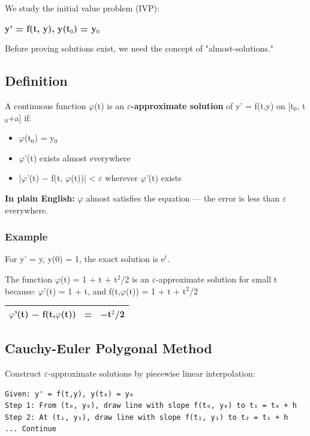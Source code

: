 \documentclass[12pt,a4paper,openany]{book}
\begin{document}
{{We study the initial value problem (IVP):

\textbf{y' = f(t, y), y(t$_0$) = y$_0$}

Before proving solutions exist, we need the concept of "almost-solutions."

\subsection{Definition}

A continuous function $\varphi$(t) is an \textbf{$\varepsilon$-approximate solution} of y' = f(t,y) on [t$_0$, t$_0$+a] if:

\begin{itemize}
  \item $\varphi$(t$_0$) = y$_0$
  \item $\varphi$'(t) exists almost everywhere
  \item |$\varphi$'(t) − f(t, $\varphi$(t))| < $\varepsilon$ wherever $\varphi$'(t) exists
\end{itemize}

\textbf{In plain English:} $\varphi$ almost satisfies the equation — the error is less than $\varepsilon$ everywhere.

\subsubsection{Example}
For y' = y, y(0) = 1, the exact solution is e$^t$.

The function $\varphi$(t) = 1 + t + t$^2$/2 is an $\varepsilon$-approximate solution for small t because:
$\varphi$'(t) = 1 + t, and f(t,$\varphi$(t)) = 1 + t + t$^2$/2

\begin{center}
\begin{tabular}{|l|l|l|}
\hline
\textbf{$\varphi$'(t) − f(t,$\varphi$(t))} & \textbf{=} & \textbf{−t$^2$/2} \\
\hline
\end{tabular}
\end{center}

\subsection{Cauchy-Euler Polygonal Method}

Construct $\varepsilon$-approximate solutions by piecewise linear interpolation:

\begin{verbatim}
Given: y' = f(t,y), y(t₀) = y₀
Step 1: From (t₀, y₀), draw line with slope f(t₀, y₀) to t₁ = t₀ + h
Step 2: At (t₁, y₁), draw line with slope f(t₁, y₁) to t₂ = t₁ + h
... Continue
\end{verbatim}

}}
\end{document}
